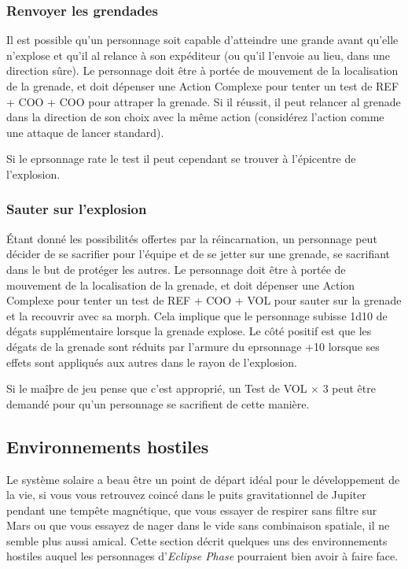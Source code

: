 \subsubsection{Renvoyer les grendades} 

Il est possible qu'un personnage soit capable d'atteindre une grande avant qu'elle n'explose et qu'il al relance à son expéditeur (ou qu'il l'envoie au lieu, dans une direction sûre). Le personnage doit être à portée de mouvement de la localisation de la grenade, et doit dépenser une Action Complexe pour tenter un test de REF + COO + COO pour attraper la grenade. Si il réussit, il peut relancer al grenade dans la direction de son choix avec la même action (considérez l'action comme une attaque de lancer standard). 

Si le eprsonnage rate le test il peut cependant se trouver à l'épicentre de l'explosion. 

\subsubsection{Sauter sur l'explosion} 

Étant donné les possibilités offertes par la réincarnation, un personnage peut décider de se sacrifier pour l'équipe et de se jetter sur une grenade, se sacrifiant dans le but de protéger les autres. Le personnage doit être à portée de mouvement de la localisation de la grenade, et doit dépenser une Action Complexe pour tenter un test de REF + COO + VOL pour sauter sur la grenade et la recouvrir avec sa morph. Cela implique que le personnage subisse 1d10 de dégats supplémentaire lorsque la grenade explose. Le côté positif est que les dégats de la grenade sont réduits par l'armure du eprsonnage +10 lorsque ses effets sont appliqués aux autres dans le rayon de l'explosion. 

Si le maîþre de jeu pense que c'est approprié, un Test de VOL $\times$ 3 peut être demandé pour qu'un personnage se sacrifient de cette manière. 

\subsection{Environnements hostiles} \label{sec:hostile-environments} Le système solaire a beau être un point de départ idéal pour le développement de la vie, si vous vous retrouvez coincé dans le puits gravitationnel de Jupiter pendant une tempête magnétique, que vous essayer de respirer sans filtre sur Mars ou que vous essayez de nager dans le vide sans combinaison spatiale, il ne semble plus aussi amical. Cette section décrit quelques uns des environnements hostiles auquel les personnages d'\emph{Eclipse Phase} pourraient bien avoir à faire face. 

